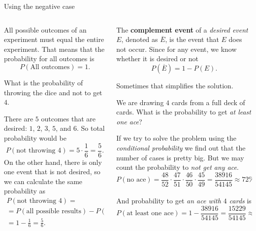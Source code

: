 \documentclass[9pt,aspectratio=169]{beamer}
\begin{document}
\begin{frame}{Using the negative case}
  \begin{columns}[T]
    \begin{column}{0.5\textwidth}
      All possible outcomes of an experiment must equal the entire experiment.  That means that the probability for all outcomes is
      \[ P(\text{All outcomes}) = 1. \]
      \vspace*{-1em}
      \begin{problem}
        What is the probability of throwing the dice and not to get $4$. 
      \end{problem}
      There are $5$ outcomes that are desired: $1$, $2$, $3$, $5$, and $6$. So total probability would be 
      \[ P(\text{not throwing $4$}) = 5 \cdot \frac{1}{6} = \frac{5}{6}. \]
      On the other hand, there is only one event that is not desired, so we can calculate the same probability as
      \begin{multline*} 
        P(\text{not throwing $4$}) = \\
        = P(\text{all possible results}) - P(\text{throwing $4$}) = \\
        = 1 - \frac{1}{6} = \frac{5}{6}.
      \end{multline*}
    \end{column}
    \begin{column}{0.5\textwidth}
      \begin{definition}
        The \textbf{complement event} of a \emph{desired event $E$}, denoted as $\overline{E}$, is the event that $E$ does not occur. Since for any event, we know whether it is desired or not
        \[ P(\overline{E}) = 1 - P(E). \]
        \vspace*{-2.5ex} 
      \end{definition}
      Sometimes that simplifies the solution.
      \begin{problem}
        We are drawing $4$ cards from a full deck of cards. What is the probability to get \emph{at least one ace}?
      \end{problem}
      If we try to solve the problem using the \emph{conditional probability} we find out that the number of cases is pretty big. But we may count the probability to \emph{not get any ace}.
      \[ P (\text{no ace}) = \frac{48}{52} \cdot \frac{47}{51} \cdot \frac{46}{50} \cdot \frac{45}{49} = \frac{38916}{54145} \approx 72\%.\]\\[-1ex]
      And probability to get \emph{an ace with $4$ cards} is
      \[ P (\text{at least one ace}) = 1 - \frac{38916}{54145} = \frac{15229}{54145} \approx 28 \%. \]
    \end{column}
  \end{columns}
\end{frame}
\end{document}
